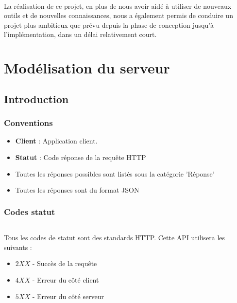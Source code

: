 \documentclass[titlepage]{report}
\begin{document}
\paragraph{} La réalisation de ce projet, en plus de nous avoir aidé à utiliser de nouveaux outils et de nouvelles connaissances, nous a également permis de conduire un projet plus ambitieux que prévu depuis la phase de conception jusqu'à l'implémentation, dans un délai relativement court.

\clearpage
\part{Modélisation du serveur}
\label{part_modelServer}

\lstset{language=XML,
	basicstyle=\ttfamily,
	breaklines=true} 

\chapter{Introduction}

\section{Conventions}
\begin{itemize}
	\item \textbf{Client} : Application client.
	\item \textbf{Statut} : Code réponse de la requête HTTP
	\item Toutes les réponses possibles sont listés sous la catégorie 'Réponse'
	\item Toutes les réponses sont du format JSON
\end{itemize}


\section{Codes statut}

\paragraph{} Tous les codes de statut sont des standards HTTP. Cette API utilisera les suivants : 
\begin{itemize}
	\item $ 2XX $ - Succès de la requête
	\item $ 4XX $ - Erreur du côté client
	\item $ 5XX $ - Erreur du côté serveur		
\end{itemize}
\end{document}
